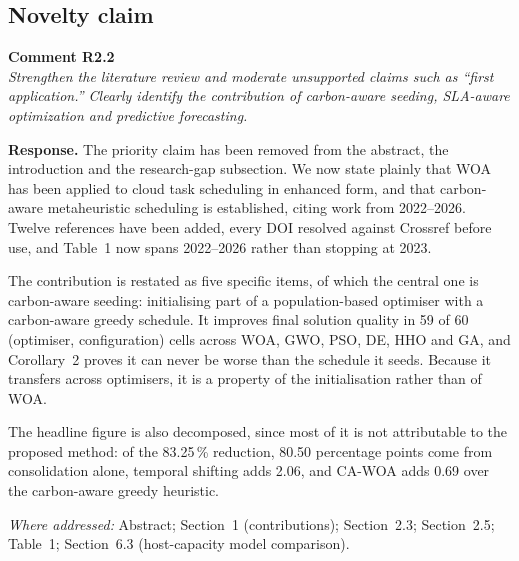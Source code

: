 \documentclass[11pt,a4paper]{article}
\newcommand{\rsp}[1]{\vspace{2pt}\noindent\textbf{Response.} #1\par\vspace{6pt}}
\newcommand{\rwhere}[1]{\noindent\textit{Where addressed:} #1\par\vspace{10pt}}
\newenvironment{revcomment}[1]
  {\begin{tcolorbox}[colback=gray!6,colframe=gray!45,boxrule=0.4pt,
     left=6pt,right=6pt,top=4pt,bottom=4pt]\textbf{#1}\\[2pt]\itshape\color{cmt}}
  {\end{tcolorbox}\vspace{4pt}}
\begin{document}
\subsection*{Novelty claim}
\begin{revcomment}{Comment R2.2}
Strengthen the literature review and moderate unsupported claims such as ``first
application.'' Clearly identify the contribution of carbon-aware seeding,
SLA-aware optimization and predictive forecasting.
\end{revcomment}
\rsp{The priority claim has been removed from the abstract, the introduction and
the research-gap subsection. We now state plainly that WOA has been applied to
cloud task scheduling in enhanced form, and that carbon-aware metaheuristic
scheduling is established, citing work from 2022--2026. Twelve references have been
added, every DOI resolved against Crossref before use, and Table~1 now spans
2022--2026 rather than stopping at 2023.

The contribution is restated as five specific items, of which the central one is
carbon-aware seeding: initialising part of a population-based optimiser with a
carbon-aware greedy schedule. It improves final solution quality in 59 of 60
(optimiser, configuration) cells across WOA, GWO, PSO, DE, HHO and GA, and
Corollary~2 proves it can never be worse than the schedule it seeds. Because it
transfers across optimisers, it is a property of the initialisation rather than of
WOA.

The headline figure is also decomposed, since most of it is not attributable to
the proposed method: of the 83.25\,\% reduction, 80.50 percentage points come from
consolidation alone, temporal shifting adds 2.06, and CA-WOA adds 0.69 over the
carbon-aware greedy heuristic.}
\rwhere{Abstract; Section~1 (contributions); Section~2.3; Section~2.5;
Table~1; Section~6.3 (host-capacity model comparison).}
\end{document}
